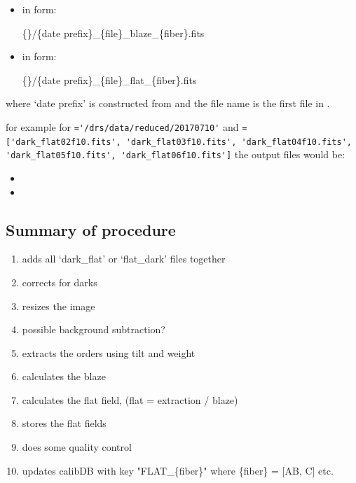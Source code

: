 \begin{itemize}

\item {} in form:
\begin{tcustomdir}
\{\reduceddir\}/\{date prefix\}\_\{file\}\_blaze\_\{fiber\}.fits
\end{tcustomdir}

\item {} in form:
\begin{tcustomdir}
\{\reduceddir\}/\{date prefix\}\_\{file\}\_flat\_\{fiber\}.fits
\end{tcustomdir}

\end{itemize}


\noindent where `date prefix' is constructed from \argnightname and the file name is the first file in \argfilenames.


\noindent for example for \reduceddir\lstinline[style=pythoninline]|='/drs/data/reduced/20170710'| and \argfilenames\lstinline[style=pythoninline]|=['dark_flat02f10.fits', 'dark_flat03f10.fits', 'dark_flat04f10.fits', 'dark_flat05f10.fits', 'dark_flat06f10.fits']| the output files would be:
\begin{tcustomdir}
\begin{itemize}
\item {}
\item {}
\end{itemize}
\end{tcustomdir}

\subsection{Summary of procedure}
\begin{enumerate}
\item adds all `dark\_flat' or `flat\_dark' files together
\item corrects for darks
\item resizes the image
\item possible background subtraction?
\item extracts the orders using tilt and weight
\item calculates the blaze
\item calculates the flat field, (flat = extraction / blaze)
\item stores the flat fields
\item does some quality control
\item updates calibDB with key "FLAT\_\{fiber\}" where \{fiber\} = [AB, C] etc.
\end{enumerate}

